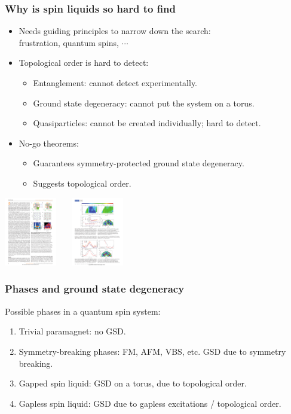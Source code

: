 \documentclass[xcolor=table, 10pt, aspectratio=43]{beamer}
\begin{document}
\begin{frame}
\frametitle{Why is spin liquids so hard to find}
\begin{itemize}
\item Needs guiding principles to narrow down the search:\\
frustration, quantum spins, $\cdots$
\item Topological order is hard to detect:
\begin{itemize}
\item Entanglement: cannot detect experimentally.
\item Ground state degeneracy: cannot put the system on a torus.
\item Quasiparticles: cannot be created individually; hard to detect.
\end{itemize}
\item No-go theorems:
\begin{itemize}
\item Guarantees symmetry-protected ground state degeneracy.
\item Suggests topological order.
\end{itemize}
\end{itemize}

\begin{center}
  \includegraphics[height=3cm]{../spinexp/spinwaveins}~~~
  \includegraphics[height=3cm]{../spinexp/continuumins}
\end{center}
\end{frame}

\begin{frame}
\frametitle{Phases and ground state degeneracy}
Possible phases in a quantum spin system:
\begin{enumerate}
  \item<1-4> Trivial paramagnet: no GSD.
  \item<2-> Symmetry-breaking phases: FM, AFM, VBS, etc. GSD due to symmetry breaking.
  \item<3-> Gapped spin liquid: GSD on a torus, due to topological order.
  \item<4-> Gapless spin liquid: GSD due to gapless excitations / topological order.
\end{enumerate}
\end{frame}
\end{document}
